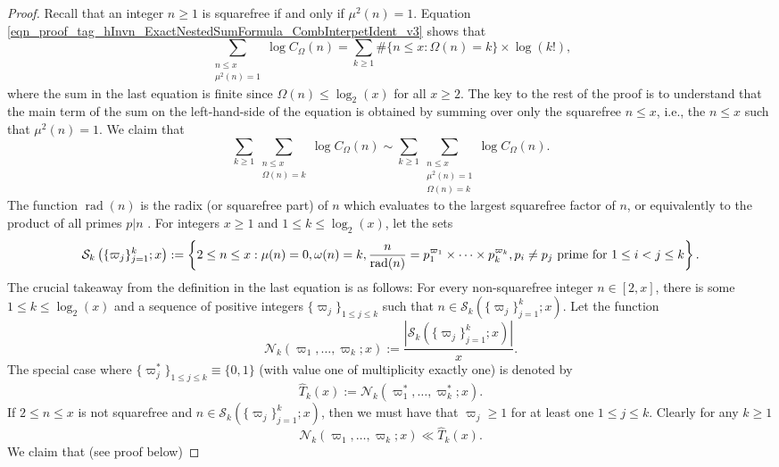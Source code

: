 \documentclass[11pt,reqno,a4letter]{article}
\numberwithin{equation}{section}
\numberwithin{figure}{section}
\numberwithin{table}{section}
\newcommand{\seqnum}[1]{\href{http://oeis.org/#1}{\color{ProcessBlue}{\underline{#1}}}}
\theoremstyle{plain}
\numberwithin{theorem}{section}
\theoremstyle{definition}
\theoremstyle{remark}
\newcommand{\mathtext}[1]{\text{\rm #1}}
\begin{document}
\begin{proof}
Recall that an integer $n \geq 1$ is squarefree if and only if $\mu^2(n) = 1$. 
Equation \eqref{eqn_proof_tag_hInvn_ExactNestedSumFormula_CombInterpetIdent_v3} shows that 
\[
\sum_{\substack{n \leq x \\ \mu^2(n)=1}} \log C_{\Omega}(n) = 
	\sum_{k \geq 1} \#\{n \leq x: \Omega(n)=k\} \times \log(k!), 
\]
where the sum in the last equation is finite since $\Omega(n) \leq \log_2(x)$ 
for all $x \geq 2$. 
The key to the rest of the proof is to understand that the main term of the 
sum on the left-hand-side of the equation is obtained by summing over only 
the squarefree $n \leq x$, i.e., the $n \leq x$ such that $\mu^2(n) = 1$. 
We claim that 
\[
\sum_{k \geq 1} \sum_{\substack{n \leq x \\ \Omega(n)=k}} \log C_{\Omega}(n) \sim 
	\sum_{k \geq 1} \sum_{\substack{n \leq x \\ \mu^2(n) = 1 \\ \Omega(n)=k}} \log C_{\Omega}(n). 
\]
The function $\operatorname{rad}(n)$ is the radix (or squarefree part) of $n$ which evaluates 
to the largest squarefree factor of $n$, 
or equivalently to the product of all primes $p | n$ 
\cite[\seqnum{A007913}]{OEIS}. 
For integers $x \geq 1$ and $1 \leq k \leq \log_2(x)$, let the sets 
\[
\mathcal{S}_k\left(\{\varpi_j\}_{j=1}^k; x\right) := \left\{2 \leq n \leq x: \mu(n) = 0, \omega(n) = k, 
	\frac{n}{\operatorname{rad}(n)} = p_1^{\varpi_1} \times \cdots \times p_k^{\varpi_k}, 
	\mathtext{ $p_i \neq p_j$ prime for $1 \leq i < j \leq k$}\right\}. 
\]
The crucial takeaway from the definition in the last equation is as follows: 
For every non-squarefree integer $n \in [2, x]$, there is some $1 \leq k \leq \log_2(x)$ 
and a sequence of positive integers $\{\varpi_j\}_{1 \leq j \leq k}$ such that 
$n \in \mathcal{S}_k\left(\{\varpi_j\}_{j=1}^k; x\right)$. 
Let the function 
$$\mathcal{N}_k(\varpi_1, \ldots, \varpi_k; x) := 
  \frac{\left\lvert \mathcal{S}_k\left(\{\varpi_j\}_{j=1}^k; x\right) \right\rvert}{x}.$$ 
The special case where $\{\varpi_j^{\ast}\}_{1 \leq j \leq k} \equiv \{0, 1\}$ 
(with value one of multiplicity exactly one) is denoted by 
$$\widehat{T}_k(x) := \mathcal{N}_k\left(\varpi_1^{\ast}, \ldots, \varpi_k^{\ast}; x\right).$$ 
If $2 \leq n \leq x$ is not squarefree and $n \in \mathcal{S}_k\left(\{\varpi_j\}_{j=1}^k; x\right)$, then 
we must have that $\varpi_j \geq 1$ for at least one $1 \leq j \leq k$. 
Clearly for any $k \geq 1$ 
\[
\mathcal{N}_k(\varpi_1, \ldots, \varpi_k; x) \ll \widehat{T}_k(x). 
\]
We claim that (see proof below) 

\end{proof}
\end{document}
